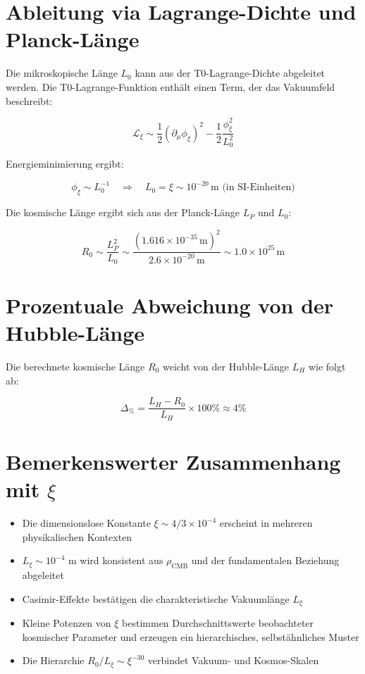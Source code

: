 \documentclass[12pt,a4paper]{article}
\numberwithin{equation}{section}
\begin{document}
	\section{Ableitung via Lagrange-Dichte und Planck-Länge}
	
	Die mikroskopische Länge $L_0$ kann aus der T0-Lagrange-Dichte abgeleitet werden. Die T0-Lagrange-Funktion enthält einen Term, der das Vakuumfeld beschreibt:
	
	\[
	\mathcal{L}_{\xi} \sim \frac{1}{2} (\partial_\mu \phi_\xi)^2 - \frac{1}{2} \frac{\phi_\xi^2}{L_0^2}
	\]
	
	Energieminimierung ergibt:
	
	\[
	\phi_\xi \sim L_0^{-1} \quad \Rightarrow \quad L_0 = \xi \sim 10^{-20}\,\text{m (in SI-Einheiten)}
	\]
	
	Die kosmische Länge ergibt sich aus der Planck-Länge $L_P$ und $L_0$:
	
	\[
	R_0 \sim \frac{L_P^2}{L_0} \sim \frac{(1.616 \times 10^{-35}\,\text{m})^2}{2.6 \times 10^{-20}\,\text{m}} \sim 1.0 \times 10^{25}\,\text{m}
	\]
	
	\section{Prozentuale Abweichung von der Hubble-Länge}
	
	Die berechnete kosmische Länge $R_0$ weicht von der Hubble-Länge $L_H$ wie folgt ab:
	
	\[
	\Delta_{\%} = \frac{L_H - R_0}{L_H} \times 100\% \approx 4\%
	\]
	
	\section{Bemerkenswerter Zusammenhang mit $\xi$}
	
	\begin{itemize}
		\item Die dimensionslose Konstante $\xi \sim 4/3 \times 10^{-4}$ erscheint in mehreren physikalischen Kontexten
		\item $L_\xi \sim 10^{-4}$ m wird konsistent aus $\rho_{\text{CMB}}$ und der fundamentalen Beziehung abgeleitet
		\item Casimir-Effekte bestätigen die charakteristische Vakuumlänge $L_\xi$
		\item Kleine Potenzen von $\xi$ bestimmen Durchschnittswerte beobachteter kosmischer Parameter und erzeugen ein hierarchisches, selbstähnliches Muster
		\item Die Hierarchie $R_0 / L_\xi \sim \xi^{-30}$ verbindet Vakuum- und Kosmos-Skalen
	\end{itemize}
	
\end{document}
